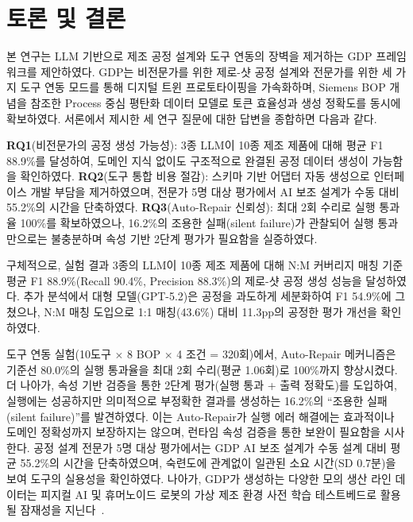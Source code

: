 \documentclass[conference]{IEEEtran}
\begin{document}
\section{토론 및 결론}

본 연구는 LLM 기반으로 제조 공정 설계와 도구 연동의 장벽을 제거하는 GDP 프레임워크를 제안하였다. GDP는 비전문가를 위한 제로-샷 공정 설계와 전문가를 위한 세 가지 도구 연동 모드를 통해 디지털 트윈 프로토타이핑을 가속화하며, Siemens BOP 개념을 참조한 Process 중심 평탄화 데이터 모델로 토큰 효율성과 생성 정확도를 동시에 확보하였다. 서론에서 제시한 세 연구 질문에 대한 답변을 종합하면 다음과 같다.

\textbf{RQ1}(비전문가의 공정 생성 가능성): 3종 LLM이 10종 제조 제품에 대해 평균 F1 88.9\%를 달성하여, 도메인 지식 없이도 구조적으로 완결된 공정 데이터 생성이 가능함을 확인하였다. \textbf{RQ2}(도구 통합 비용 절감): 스키마 기반 어댑터 자동 생성으로 인터페이스 개발 부담을 제거하였으며, 전문가 5명 대상 평가에서 AI 보조 설계가 수동 대비 55.2\%의 시간을 단축하였다. \textbf{RQ3}(Auto-Repair 신뢰성): 최대 2회 수리로 실행 통과율 100\%를 확보하였으나, 16.2\%의 조용한 실패(silent failure)가 관찰되어 실행 통과만으로는 불충분하며 속성 기반 2단계 평가가 필요함을 실증하였다.

구체적으로, 실험 결과 3종의 LLM이 10종 제조 제품에 대해 N:M 커버리지 매칭 기준 평균 F1 88.9\%(Recall 90.4\%, Precision 88.3\%)의 제로-샷 공정 생성 성능을 달성하였다. 추가 분석에서 대형 모델(GPT-5.2)은 공정을 과도하게 세분화하여 F1 54.9\%에 그쳤으나, N:M 매칭 도입으로 1:1 매칭(43.6\%) 대비 11.3pp의 공정한 평가 개선을 확인하였다.

도구 연동 실험(10도구 $\times$ 8 BOP $\times$ 4 조건 = 320회)에서, Auto-Repair 메커니즘은 기준선 80.0\%의 실행 통과율을 최대 2회 수리(평균 1.06회)로 100\%까지 향상시켰다. 더 나아가, 속성 기반 검증을 통한 2단계 평가(실행 통과 + 출력 정확도)를 도입하여, 실행에는 성공하지만 의미적으로 부정확한 결과를 생성하는 16.2\%의 ``조용한 실패(silent failure)''를 발견하였다. 이는 Auto-Repair가 실행 에러 해결에는 효과적이나 도메인 정확성까지 보장하지는 않으며, 런타임 속성 검증을 통한 보완이 필요함을 시사한다. 공정 설계 전문가 5명 대상 평가에서는 GDP AI 보조 설계가 수동 설계 대비 평균 55.2\%의 시간을 단축하였으며, 숙련도에 관계없이 일관된 소요 시간(SD 0.7분)을 보여 도구의 실용성을 확인하였다. 나아가, GDP가 생성하는 다양한 모의 생산 라인 데이터는 피지컬 AI 및 휴머노이드 로봇의 가상 제조 환경 사전 학습 테스트베드로 활용될 잠재성을 지닌다~\cite{b15}.
\end{document}
